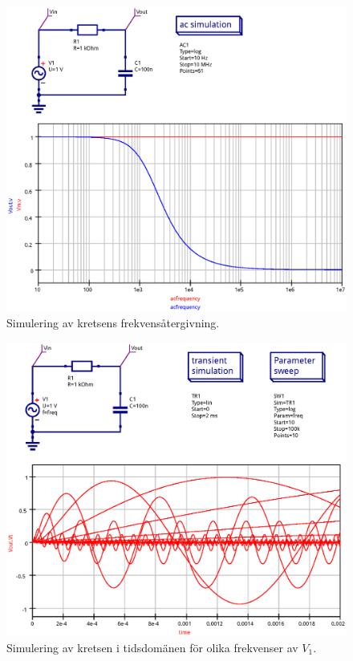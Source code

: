 \begin{figure}
    \centering
    \includegraphics[width=\linewidth]{sim/ee466_lab-4_prj/uppgift-1_ac}
    \caption[] {Simulering av kretsens frekvensåtergivning.}
    \label{fig:bode-sim-ac}
\end{figure}

\begin{figure}[ht]
    \centering
    \includegraphics[width=\linewidth]{sim/ee466_lab-4_prj/uppgift-1_tran}
    \caption[] {Simulering av kretsen i tidsdomänen för olika frekvenser av $V_1$.}
    \label{fig:bode-sim-tran}
\end{figure}

